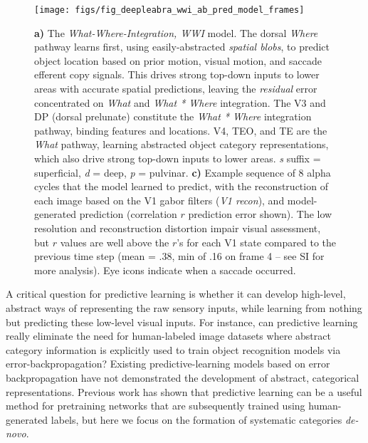\documentclass[11pt,twoside]{article}
\newif\myifpdf
\begin{document}
\begin{figure}
  \centering\texttt{[image: figs/fig\_deepleabra\_wwi\_ab\_pred\_model\_frames]}
  \caption{{\bf a)} The \emph{What-Where-Integration, WWI} model. The dorsal \emph{Where} pathway learns first, using easily-abstracted \emph{spatial blobs}, to predict object location based on prior motion, visual motion, and saccade efferent copy signals.  This drives strong top-down inputs to lower areas with accurate spatial predictions, leaving the \emph{residual} error concentrated on \emph{What} and \emph{What * Where} integration.  The V3 and DP (dorsal prelunate) constitute the \emph{What * Where} integration pathway, binding features and locations.  V4, TEO, and TE are the \emph{What} pathway, learning abstracted object category representations, which also drive strong top-down inputs to lower areas.  \emph{s} suffix = superficial, \emph{d} = deep, \emph{p} = pulvinar. {\bf c)} Example sequence of 8 alpha cycles that the model learned to predict, with the reconstruction of each image based on the V1 gabor filters (\emph{V1 recon}), and model-generated prediction (correlation $r$ prediction error shown).  The low resolution and reconstruction distortion impair visual assessment, but $r$ values are well above the $r$'s for each V1 state compared to the previous time step (mean = .38, min of .16 on frame 4 -- see SI for more analysis).  Eye icons indicate when a saccade occurred.}
  \label{fig.model}
\end{figure}

A critical question for predictive learning is whether it can develop high-level, abstract ways of representing the raw sensory inputs, while learning from nothing but predicting these low-level visual inputs.  For instance, can predictive learning really eliminate the need for human-labeled image datasets where abstract category information is explicitly used to train object recognition models via error-backpropagation?  Existing predictive-learning models based on error backpropagation \cite{LotterKreimanCox16} have not demonstrated the development of abstract, categorical representations.  Previous work has shown that predictive learning can be a useful method for pretraining networks that are subsequently trained using human-generated labels, but here we focus on the formation of systematic categories \emph{de-novo}.
\end{document}
